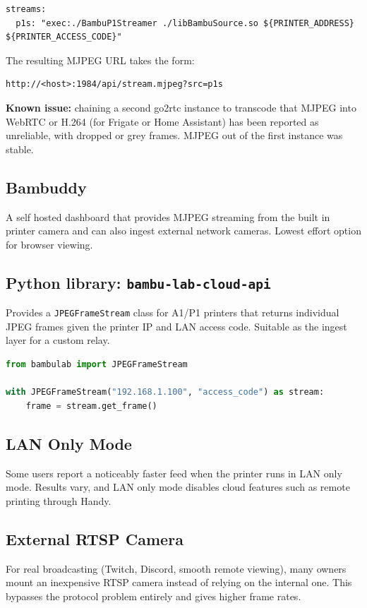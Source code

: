 \documentclass[11pt]{article}
\begin{document}
\begin{lstlisting}[language={}]
streams:
  p1s: "exec:./BambuP1Streamer ./libBambuSource.so ${PRINTER_ADDRESS} ${PRINTER_ACCESS_CODE}"
\end{lstlisting}

The resulting MJPEG URL takes the form:
\begin{lstlisting}[language={}]
http://<host>:1984/api/stream.mjpeg?src=p1s
\end{lstlisting}

\textbf{Known issue:} chaining a second go2rtc instance to transcode that MJPEG into
WebRTC or H.264 (for Frigate or Home Assistant) has been reported as unreliable, with
dropped or grey frames. MJPEG out of the first instance was stable.

\subsection{Bambuddy}
A self hosted dashboard that provides MJPEG streaming from the built in printer camera and
can also ingest external network cameras. Lowest effort option for browser viewing.

\subsection{Python library: \texttt{bambu-lab-cloud-api}}
Provides a \texttt{JPEGFrameStream} class for A1/P1 printers that returns individual JPEG
frames given the printer IP and LAN access code. Suitable as the ingest layer for a
custom relay.

\begin{lstlisting}[language=Python]
from bambulab import JPEGFrameStream

with JPEGFrameStream("192.168.1.100", "access_code") as stream:
    frame = stream.get_frame()
\end{lstlisting}

\subsection{LAN Only Mode}
Some users report a noticeably faster feed when the printer runs in LAN only mode. Results
vary, and LAN only mode disables cloud features such as remote printing through Handy.

\subsection{External RTSP Camera}
For real broadcasting (Twitch, Discord, smooth remote viewing), many owners mount an
inexpensive RTSP camera instead of relying on the internal one. This bypasses the protocol
problem entirely and gives higher frame rates.
\end{document}
